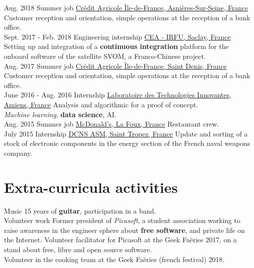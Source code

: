 \documentclass[letterpaper]{twentysecondcv} %
\begin{document}
\begin{twenty} %
    \twentyitem
    	{Aug. 2018}
		{}
        {Summer job}
        {\href{https://ca-paris.com/}{Crédit Agricole Île-de-France, Asnières-Sur-Seine, France}}
        {}
        {Customer reception and orientation, simple operations at the reception of a bank office.}
    \\
    \twentyitem
    	{Sept. 2017 -}
		{Feb. 2018}
        {Engineering internship}
        {\href{http://irfu.cea.fr/}{CEA - IRFU, Saclay, France}}
        {}
        {Setting up and integration of a \textbf{continuous integration} platform for the onboard software of the satellite SVOM, a Franco-Chinese project.}
    \\
    \twentyitem
    	{Aug. 2017}
		{}
        {Summer job}
        {\href{https://ca-paris.com/}{Crédit Agricole Île-de-France, Saint Denis, France}}
        {}
        {Customer reception and orientation, simple operations at the reception of a bank office.}
    \\
	\twentyitem
    	{June 2016 -}
		{Aug. 2016}
        {Internship}
        {\href{http://lti-picardie.fr/}{Laboratoire des Technologies Innovantes, Amiens, France}}
        {}
        {Analysis and algorithmic for a proof of concept.\\\textit{Machine learning}, \textbf{data science}, AI.}
    \\   
    \twentyitem
   		{Aug. 2015}
        {}
        {Summer job}
        {\href{https://www.restaurants.mcdonalds.fr/mcdonalds-gassin}{McDonald's, La Foux, France}}
        {}
        {Restaurant crew.}
     \\
     \twentyitem
   		{July 2015}
		{}
        {Internship}
        {\href{https://www.naval-group.com/fr/}{DCNS ASM, Saint Tropez, France}}
        {}
        {Update and sorting of a stock of electronic components in the energy section of the French naval weapons company.}
        
\end{twenty}


\section{Extra-curricula activities}
\begin{twenty}
	\twentyitem
    	{}
		{}
        {Music}
        {}
        {}
        {15 years of \textbf{guitar}, participation in a band.}
    \\
    \twentyitem
    	{}
		{}
        {Volunteer work}
        {}
        {}
        {Former president of \textit{Picasoft}, a student association working to raise awareness in the engineer sphere about \textbf{free software}, and private life on the Internet. Volunteer facilitator for Picasoft at the Geek Faëries 2017, on a stand about free, libre and open source software.\\Volunteer in the cooking team at the Geek Faëries (french festival) 2018.}
\end{twenty}
\end{document}
